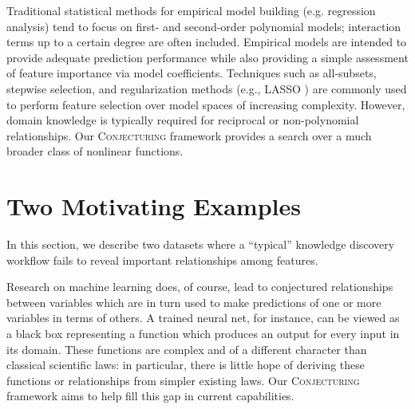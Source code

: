 \documentclass[ijds,nonblindrev]{informs-ijds}
\begin{document}



Traditional statistical methods for empirical model building (e.g. regression analysis) tend to focus on first- and second-order polynomial models; interaction terms up to a certain degree are often included. Empirical models are intended to provide adequate prediction performance while also providing a simple assessment of feature importance via model coefficients. Techniques such as all-subsets, stepwise selection, and regularization methods (e.g., LASSO \citep{Tibshirani96}) are commonly used to perform feature selection over model spaces of increasing complexity. However, domain knowledge is typically required for reciprocal or non-polynomial relationships. %
Our \textsc{Conjecturing} framework provides a search over a much broader class of nonlinear functions. 


\section{Two Motivating Examples}
\label{motivation}

In this section, we describe two datasets where a ``typical'' knowledge discovery workflow fails to reveal important relationships among features.  

Research on machine learning does, of course, lead to conjectured relationships between variables which are in turn used to make predictions of one or more variables in terms of others. A trained neural net, for instance, can be viewed as a black box representing a function which produces an output for every input in its domain. These functions are complex and of a different character than classical scientific laws: in particular, there is little hope of deriving these functions or relationships from simpler existing laws.  Our \textsc{Conjecturing} framework aims to help fill this gap in current capabilities. 
\end{document}

